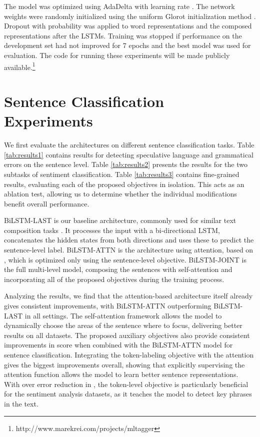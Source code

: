 \documentclass[letterpaper]{article} \usepackage{aaai19}  \usepackage{times}  \usepackage{helvet}  \usepackage{courier}  \usepackage{graphicx}
\renewcommand\cite{\citep}	\newcommand\newcite{\citet}
\begin{document}
The model was optimized using AdaDelta \cite{Zeiler2012} with learning rate .
The network weights were randomly initialized using the uniform Glorot initialization method \cite{Glorot2010}.
Dropout \cite{Srivastava2014a} with probability  was applied to word representations  and the composed representations  after the LSTMs.
Training was stopped if performance on the development set had not improved for 7 epochs and the best model was used for evaluation.
The code for running these experiments will be made publicly available.\footnote{http://www.marekrei.com/projects/mltagger}







\section{Sentence Classification Experiments}
\label{sec:sentence}

We first evaluate the architectures on different sentence classification tasks. Table \ref{tab:results1} contains results for detecting speculative language and grammatical errors on the sentence level. Table \ref{tab:results2} presents the results for the two subtasks of sentiment classification.
Table \ref{tab:results3} contains fine-grained results, evaluating each of the proposed objectives in isolation. This acts as an ablation test, allowing us to determine whether the individual modifications benefit overall performance. 

{\small BiLSTM-LAST} is our baseline architecture, commonly used for similar text composition tasks \cite{tang2015document,neelakantan2016neural}. 
It processes the input with a bi-directional LSTM, concatenates the hidden states  from both directions and uses these to predict the sentence-level label.
{\small BiLSTM-ATTN} is the architecture using attention, based on \citet{Yang2016a}, which is optimized only using the sentence-level objective.
{\small BiLSTM-JOINT} is the full multi-level model, composing the sentences with self-attention and incorporating all of the proposed objectives during the training process.


Analyzing the results, we find that the attention-based architecture itself already gives consistent improvements, with {\small BiLSTM-ATTN} outperforming {\small BiLSTM-LAST} in all settings. The self-attention framework allows the model to dynamically choose the areas of the sentence where to focus, delivering better results on all datasets.
The proposed auxiliary objectives also provide consistent improvements in  score when combined with the {\small BiLSTM-ATTN} model for sentence classification.
Integrating the token-labeling objective with the attention gives the biggest improvements overall, 
showing that explicitly supervising the attention function allows the model to learn better sentence representations. With over  error reduction in , the token-level objective is particularly beneficial for the sentiment analysis datasets, as it teaches the model to detect key phrases in the text.
\end{document}
